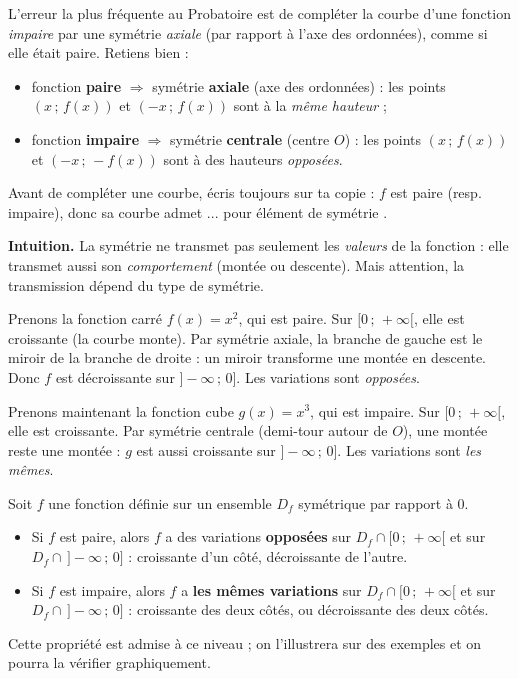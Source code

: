\documentclass[11pt]{article}
\newcommand{\cle}[1]{{\popxbold\color{popdark}#1}}
\newcounter{popsec}
\newcounter{popsub}
\newcommand{\courssub}[1]{%
  \stepcounter{popsub}%
  \par\vspace{9pt}\noindent{\popxbold\fontsize{11.5}{13}\selectfont\color{popink}{\color{poporange}\thepopsec.\thepopsub}\hspace{6pt}#1}\par\nopagebreak\vspace{4pt}
}
\begin{document}
\begin{attention}
L'erreur la plus fréquente au Probatoire est de compléter la courbe d'une fonction \emph{impaire} par une symétrie \emph{axiale} (par rapport à l'axe des ordonnées), comme si elle était paire. Retiens bien :
\begin{itemize}
\item fonction \textbf{paire} $\Rightarrow$ symétrie \textbf{axiale} (axe des ordonnées) : les points $(x\,;\,f(x))$ et $(-x\,;\,f(x))$ sont à la \emph{même hauteur} ;
\item fonction \textbf{impaire} $\Rightarrow$ symétrie \textbf{centrale} (centre $O$) : les points $(x\,;\,f(x))$ et $(-x\,;\,-f(x))$ sont à des hauteurs \emph{opposées}.
\end{itemize}
Avant de compléter une courbe, écris toujours sur ta copie : \og $f$ est paire (resp. impaire), donc sa courbe admet ... pour élément de symétrie \fg.
\end{attention}

\courssub{Parité et sens de variation}

\textbf{Intuition.} La symétrie ne transmet pas seulement les \emph{valeurs} de la fonction : elle transmet aussi son \emph{comportement} (montée ou descente). Mais attention, la transmission dépend du type de symétrie.

Prenons la fonction carré $f(x)=x^2$, qui est paire. Sur $[0\,;\,+\infty[$, elle est croissante (la courbe monte). Par symétrie axiale, la branche de gauche est le \og miroir \fg{} de la branche de droite : un miroir transforme une montée en descente. Donc $f$ est décroissante sur $]-\infty\,;\,0]$. Les variations sont \emph{opposées}.

Prenons maintenant la fonction cube $g(x)=x^3$, qui est impaire. Sur $[0\,;\,+\infty[$, elle est croissante. Par symétrie centrale (demi-tour autour de $O$), une montée reste une montée : $g$ est aussi croissante sur $]-\infty\,;\,0]$. Les variations sont \emph{les mêmes}.

\begin{propriete}
Soit $f$ une fonction définie sur un ensemble $D_f$ symétrique par rapport à $0$.
\begin{itemize}
\item Si $f$ est \cle{paire}, alors $f$ a des variations \textbf{opposées} sur $D_f \cap [0\,;\,+\infty[$ et sur $D_f \cap \,]-\infty\,;\,0]$ : croissante d'un côté, décroissante de l'autre.
\item Si $f$ est \cle{impaire}, alors $f$ a \textbf{les mêmes variations} sur $D_f \cap [0\,;\,+\infty[$ et sur $D_f \cap \,]-\infty\,;\,0]$ : croissante des deux côtés, ou décroissante des deux côtés.
\end{itemize}
Cette propriété est admise à ce niveau ; on l'illustrera sur des exemples et on pourra la vérifier graphiquement.
\end{propriete}
\end{document}
